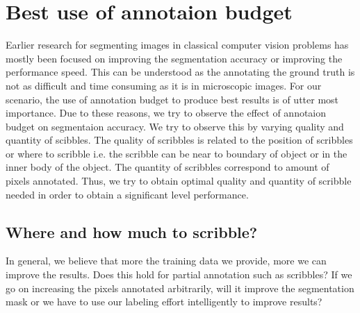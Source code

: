 \section{Best use of annotaion budget}
Earlier research for segmenting images in classical computer vision problems has mostly been focused on improving the segmentation accuracy or improving the performance speed. This can be understood as the annotating the ground truth is not as difficult and time consuming as it is in microscopic images. For our scenario, the use of annotation budget to produce best results is of utter most importance. Due to these reasons, we try to observe the effect of annotaion budget on segmentaion accuracy. We try to observe this by varying quality and quantity of scibbles. The quality of scribbles is related to the position of scribbles or where to scribble i.e. the scribble can be near to boundary of object or in the inner body of the object. The quantity of scribbles correspond to amount of pixels annotated. Thus, we try to obtain optimal quality and quantity of scribble needed in order to obtain a significant level performance.

\subsection{Where and how much to scribble?}
In general, we believe that more the training data we provide, more we can improve the results. Does this hold for partial annotation such as scribbles? If we go on increasing the pixels annotated arbitrarily, will it improve the segmentation mask or we have to use our labeling effort intelligently to improve results?


